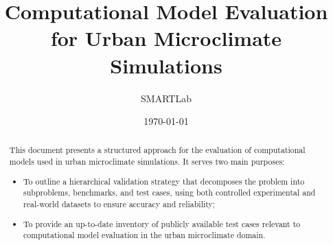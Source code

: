 \documentclass[a4paper, 12pt]{article}
\title{Computational Model Evaluation for Urban Microclimate Simulations}
\author{SMARTLab}
\date{\today}
\begin{document}

\maketitle

\begin{abstract}
\noindent
This document presents a structured approach for the evaluation of computational models used in urban microclimate simulations. It serves two main purposes:
\begin{itemize}
    \item To outline a hierarchical validation strategy that decomposes the problem into subproblems, benchmarks, and test cases, using both controlled experimental and real-world datasets to ensure accuracy and reliability;
    \item To provide an up-to-date inventory of publicly available test cases relevant to computational model evaluation in the urban microclimate domain.
\end{itemize}
\end{abstract}


\tableofcontents










\printbibliography[title={References}]
\end{document}
